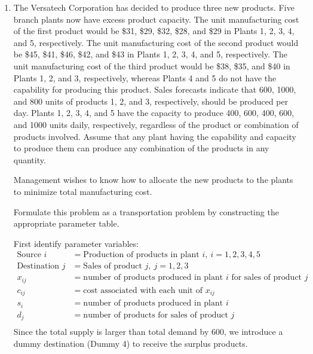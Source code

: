 \documentclass[a4paper]{article}
\begin{document}
\courseheader
{}

\begin{enumerate}
  \setlength{\itemsep}{3\parskip}

  \item The Versatech Corporation has decided to produce three new products. Five branch plants now have excess product capacity. The unit manufacturing cost of the first product would be \$31, \$29, \$32, \$28, and \$29 in Plants 1, 2, 3, 4, and 5, respectively. The unit manufacturing cost of the second product would be \$45, \$41, \$46, \$42, and \$43 in Plants 1, 2, 3, 4, and 5, respectively. The unit manufacturing cost of the third product would be \$38, \$35, and \$40 in Plants 1, 2, and 3, respectively, whereas Plants 4 and 5 do not have the capability for producing this product. Sales forecasts indicate that 600, 1000, and 800 units of products 1, 2, and 3, respectively, should be produced per day. Plants 1, 2, 3, 4, and 5 have the capacity to produce 400, 600, 400, 600, and 1000 units daily, respectively, regardless of the product or combination of products involved. Assume that any plant having the capability and capacity to produce them can produce any combination of the products in any quantity.
  
  \hspace*{4ex}Management wishes to know how to allocate the new products to the plants to minimize total manufacturing cost.
  
  \hspace*{4ex}Formulate this problem as a transportation problem by constructing the appropriate parameter table.
  \begin{solution}
  	First identify parameter variables:
   \begin{equation*}
   \begin{aligned}
   \text{Source }i&=\text{Production of products in plant }i,\ i=1,2,3,4,5\\
   \text{Destination }j&=\text{Sales of product }j,\ j=1,2,3\\
   x_{ij}&=\text{number of products produced in plant } i \text{ for sales of product } j\\
   c_{ij}&=\text{cost associated with each unit of }x_{ij}\\
   s_i&=\text{number of products produced in plant }i\\
   d_j&=\text{number of products for sales of product } j\\
   \end{aligned}
   \end{equation*}
   Since the total supply is larger than total demand by 600, we introduce a dummy destination (Dummy 4) to receive the surplus products.
   

\end{solution}
\end{enumerate}
\end{document}
